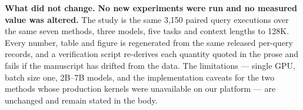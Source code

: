 \documentclass[10pt]{article}
\begin{document}
\medskip
\noindent\textbf{What did not change.}
\textbf{No new experiments were run and no measured value was altered.} The
study is the same 3{,}150 paired query executions over the same seven methods,
three models, five tasks and context lengths to 128K. Every number, table and
figure is regenerated from the same released per-query records, and a
verification script re-derives each quantity quoted in the prose and fails if
the manuscript has drifted from the data. The limitations --- single GPU, batch
size one, 2B--7B models, and the implementation caveats for the two methods
whose production kernels were unavailable on our platform --- are unchanged and
remain stated in the body.
\end{document}
